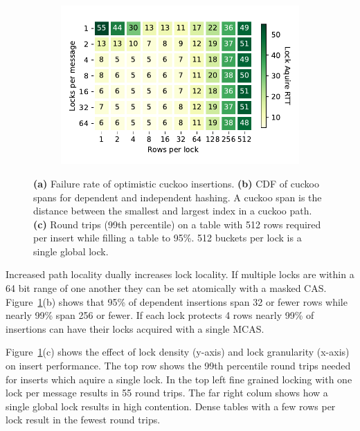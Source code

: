 \begin{figure}[t]
\begin{subfigure}{0.3\linewidth}
    \end{subfigure}
    \begin{subfigure}{0.3\linewidth}
        \includegraphics[width=0.99\linewidth]{fig/buckets_per_lock_vs_locks_per_message.pdf}
    \end{subfigure}
    \vspace{-1em}
    \caption{
    \textbf{(a)} Failure rate of optimistic cuckoo insertions.
    \textbf{(b)} CDF of cuckoo spans for dependent and independent hashing. A cuckoo span is the distance between the smallest and largest index in a cuckoo path.~
    \textbf{(c)} Round trips (99th percentile) on a table
    with 512 rows required per insert while filling a table
    to 95\%. 512 buckets per lock is a single global lock.}

    \label{fig:cuckoo-problems}

\end{figure}

Increased path locality dually increases lock locality. If
multiple locks are within a 64 bit range of one another they
can be set atomically with a masked CAS.
Figure~\ref{fig:cuckoo-problems}(b) shows that 95\% of
dependent insertions span 32 or fewer rows while nearly 99\%
span 256 or fewer. If each lock protects 4 rows nearly 99\%
of insertions can have their locks acquired with a single
MCAS.

Figure~\ref{fig:cuckoo-problems}(c) shows the effect of lock
density (y-axis) and lock granularity (x-axis) on insert
performance. The top row shows the 99th percentile round
trips needed for inserts which aquire a single lock. In the
top left fine grained locking with one lock per message
results in 55 round trips. The far right colum shows how a
single global lock results in high contention. Dense tables
with a few rows per lock result in the fewest round trips.

